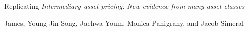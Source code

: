 {
\fontsize{12}{14}\selectfont
\textnormal{Replicating} \textit{Intermediary asset pricing: New evidence from many asset classes}
}

\bigskip

{
\fontsize{10}{12}\selectfont
James, Young Jin Song, Jaehwa Youm, Monica Panigrahy, and Jacob Simeral
}
